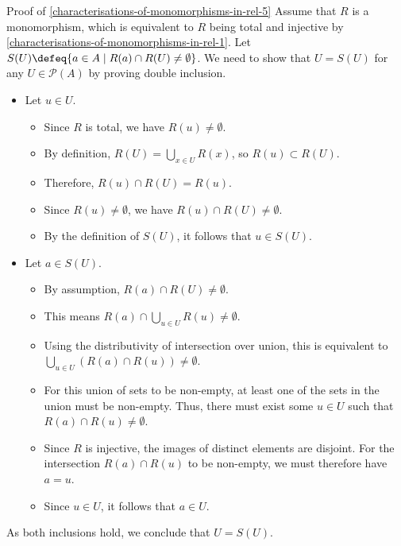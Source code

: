 \begin{Proof}{Proof of \cref{characterisations-of-monomorphisms-in-rel-5}}
    Assume that $R$ is a monomorphism, which is equivalent to $R$ being total and injective by \cref{characterisations-of-monomorphisms-in-rel-1}. Let $S(U)\defeq\{a\in A \mid R(a)\cap R(U)\neq\emptyset\}$. We need to show that $U = S(U)$ for any $U \in \mathcal{P}(A)$ by proving double inclusion.
    \begin{itemize}
        \item{}Let $u\in U$.
            \begin{itemize}
                \item Since $R$ is total, we have $R(u)\neq\emptyset$.
                \item By definition, $R(U)=\bigcup_{x\in U}R(x)$, so $R(u)\subset R(U)$.
                \item Therefore, $R(u)\cap R(U)=R(u)$.
                \item Since $R(u)\neq\emptyset$, we have $R(u)\cap R(U)\neq\emptyset$.
                \item By the definition of $S(U)$, it follows that $u\in S(U)$.
            \end{itemize}
        \item{}Let $a\in S(U)$.
            \begin{itemize}
                \item By assumption, $R(a)\cap R(U)\neq\emptyset$.
                \item This means $R(a)\cap\bigcup_{u\in U}R(u)\neq\emptyset$.
                \item Using the distributivity of intersection over union, this is equivalent to $\bigcup_{u\in U}(R(a)\cap R(u))\neq\emptyset$.
                \item For this union of sets to be non-empty, at least one of the sets in the union must be non-empty. Thus, there must exist some $u\in U$ such that $R(a)\cap R(u)\neq\emptyset$.
                \item Since $R$ is injective, the images of distinct elements are disjoint. For the intersection $R(a)\cap R(u)$ to be non-empty, we must therefore have $a=u$.
                \item Since $u\in U$, it follows that $a\in U$.
            \end{itemize}
    \end{itemize}
    As both inclusions hold, we conclude that $U=S(U)$.


\end{Proof}
